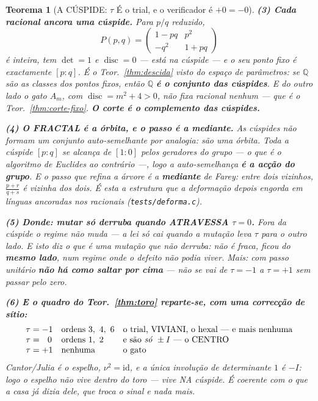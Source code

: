 \documentclass[11pt,a4paper]{article}
\newtheorem{teorema}{Teorema}
\newcommand{\code}[1]{\texttt{\small #1}}
\begin{document}
\begin{teorema}[A CÚSPIDE: $\tau$ É o trial, e o verificador é $+0=-0$]
\textbf{(3) Cada racional ancora uma cúspide.} Para $p/q$ reduzido,
\[
P(p,q)=\begin{pmatrix}1-pq & p^{2}\\ -q^{2} & 1+pq\end{pmatrix}
\]
é inteira, tem $\det=1$ e $\operatorname{disc}=0$ --- está na cúspide --- e o seu ponto fixo
é exactamente $[p:q]$. \emph{É o Teor.~\ref{thm:descida} visto do espaço de parâmetros}: se
$\mathbb{Q}$ são as classes dos pontos fixos, então $\mathbb{Q}$ \textbf{é o conjunto das
cúspides}. E do outro lado o gato $A_m$, com $\operatorname{disc}=m^{2}+4>0$, não fixa
racional nenhum --- que é o Teor.~\ref{thm:corte-fixo}. \textbf{O corte é o complemento das
cúspides.}

\textbf{(4) O FRACTAL é a órbita, e o passo é a mediante.} As cúspides não formam um
conjunto auto-semelhante por analogia: são \emph{uma} órbita. Toda a cúspide $[p:q]$ se
alcança de $[1:0]$ pelos geradores do grupo --- o que é o algoritmo de Euclides ao contrário
---, logo a auto-semelhança \textbf{é a acção do grupo}. E o passo que refina a árvore é a
\textbf{mediante} de Farey: entre dois vizinhos, $\frac{p+r}{q+s}$ é vizinha dos dois. É
esta a estrutura que a deformação depois engorda em línguas ancoradas nos racionais
(\code{tests/deforma.c}).

\textbf{(5) Donde: mutar só derruba quando ATRAVESSA $\tau=0$.} Fora da cúspide o regime
não muda --- a lei só cai quando a mutação leva $\tau$ para o outro lado. \emph{E isto diz o
que é uma mutação que não derruba}: não é fraca, ficou do \textbf{mesmo lado}, num regime
onde o defeito não podia viver. Mais: com passo unitário \textbf{não há como saltar por
cima} --- não se vai de $\tau=-1$ a $\tau=+1$ sem passar pelo zero.

\textbf{(6) E o quadro do Teor.~\ref{thm:toro} reparte-se, com uma correcção de sítio:}
\[
\begin{array}{lll}
\tau=-1 & \text{ordens }3,\ 4,\ 6 & \text{o trial, VIVIANI, o hexal --- e mais nenhuma}\\
\tau=\ \ 0 & \text{ordens }1,\ 2 & \text{e são \emph{só} }\pm I\text{ --- o CENTRO}\\
\tau=+1 & \text{nenhuma} & \text{o gato}
\end{array}
\]
Cantor/Julia é o espelho, $\nu^{2}=\mathrm{id}$, e a única involução de determinante $1$ é
$-I$: \emph{logo o espelho não vive dentro do toro --- vive NA cúspide}. É coerente com o
que a casa já dizia dele, que troca o sinal e nada mais.


\end{teorema}
\end{document}
